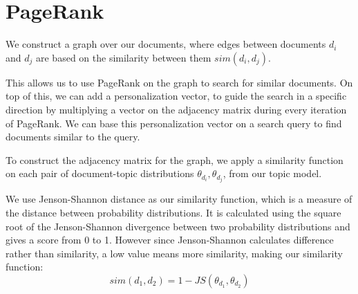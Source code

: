\section{PageRank}\label{sec:pagerank}
We construct a graph over our documents, where edges between documents $d_i$ and $d_j$ are based on the similarity between them $sim(d_i, d_j)$.

This allows us to use PageRank on the graph to search for similar documents.
On top of this, we can add a personalization vector, to guide the search in a specific direction by multiplying a vector on the adjacency matrix during every iteration of PageRank.
We can base this personalization vector on a search query to find documents similar to the query.

To construct the adjacency matrix for the graph, we apply a similarity function on each pair of document-topic distributions $\theta_{d_i}, \theta_{d_j}$, from our topic model.

We use Jenson-Shannon distance as our similarity function, which is a measure of the distance between probability distributions\cite{jensen-shannon2003}\cite{jensen-shannondis2003}.
It is calculated using the square root of the Jenson-Shannon divergence between two probability distributions and gives a score from 0 to 1.
However since Jenson-Shannon calculates difference rather than similarity, a low value means more similarity, making our similarity function:
$$sim(d_1, d_2) = 1 - JS(\theta_{d_1}, \theta_{d_2})$$


